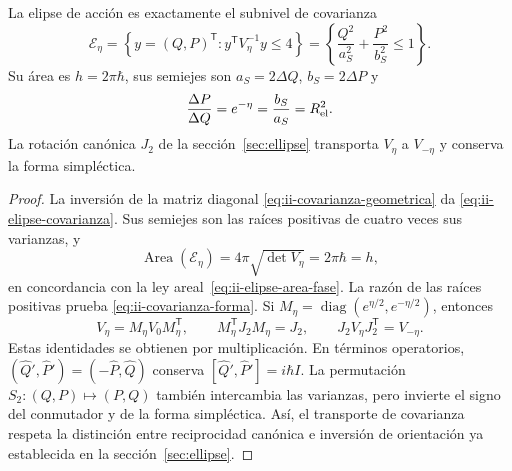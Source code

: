 \begin{proposition}
\label{prop:ii-area-covarianza-reciprocidad}
La elipse de acción es exactamente el subnivel de covarianza
\begin{equation}
 \mathcal E_\eta
 =\left\{y=(Q,P)^{\mathsf T}:y^{\mathsf T}V_\eta^{-1}y\leq4\right\}
 =\left\{\frac{Q^2}{a_S^2}+\frac{P^2}{b_S^2}\leq1\right\}.
 \label{eq:ii-elipse-covarianza}
\end{equation}
Su área es \(h=2\pi\hbar\), sus semiejes son
\(a_S=2\Delta Q\), \(b_S=2\Delta P\) y
\begin{equation}
 \frac{\Delta P}{\Delta Q}=e^{-\eta}
 =\frac{b_S}{a_S}=R_{\rm el}^2.
 \label{eq:ii-covarianza-forma}
\end{equation}
La rotación canónica \(J_2\) de la sección~\ref{sec:ellipse} transporta
\(V_\eta\) a \(V_{-\eta}\) y conserva la forma simpléctica.
\end{proposition}

\begin{proof}
La inversión de la matriz diagonal
\eqref{eq:ii-covarianza-geometrica} da
\eqref{eq:ii-elipse-covarianza}. Sus semiejes son las raíces positivas de
cuatro veces sus varianzas, y
\[
 \operatorname{Area}(\mathcal E_\eta)
 =4\pi\sqrt{\det V_\eta}=2\pi\hbar=h,
\]
en concordancia con la ley areal~\eqref{eq:ii-elipse-area-fase}.
La razón de las raíces positivas prueba
\eqref{eq:ii-covarianza-forma}.
Si \(M_\eta=\operatorname{diag}(e^{\eta/2},e^{-\eta/2})\), entonces
\[
 V_\eta=M_\eta V_0M_\eta^{\mathsf T},\qquad
 M_\eta^{\mathsf T}J_2M_\eta=J_2,\qquad
 J_2V_\eta J_2^{\mathsf T}=V_{-\eta}.
\]
Estas identidades se obtienen por multiplicación. En términos operatorios,
\((\widehat Q',\widehat P')=(-\widehat P,\widehat Q)\) conserva
\([\widehat Q',\widehat P']=i\hbar I\). La permutación
\(S_2:(Q,P)\mapsto(P,Q)\) también intercambia las varianzas, pero invierte
el signo del conmutador y de la forma simpléctica. Así, el transporte de
covarianza respeta la distinción entre reciprocidad canónica e inversión
de orientación ya establecida en la sección~\ref{sec:ellipse}.
\end{proof}

